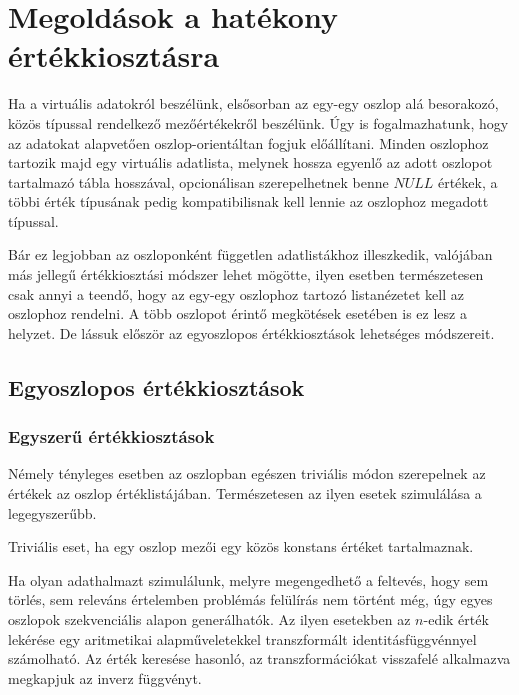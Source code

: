 \documentclass[
    parspace, %
    noindent, %
]{elteiktdk}[2023/10/30]
\begin{document}

\section{Megoldások a hatékony értékkiosztásra}

Ha a virtuális adatokról beszélünk, elsősorban az egy-egy oszlop alá besorakozó,
közös típussal rendelkező mezőértékekről beszélünk.
Úgy is fogalmazhatunk, hogy az adatokat alapvetően oszlop-orientáltan fogjuk előállítani.
Minden oszlophoz tartozik majd egy virtuális adatlista,
melynek hossza egyenlő az adott oszlopot tartalmazó tábla hosszával,
opcionálisan szerepelhetnek benne $NULL$ értékek,
a többi érték típusának pedig kompatibilisnak kell lennie az oszlophoz megadott típussal.

Bár ez legjobban az oszloponként független adatlistákhoz illeszkedik,
valójában más jellegű értékkiosztási módszer lehet mögötte,
ilyen esetben természetesen csak annyi a teendő,
hogy az egy-egy oszlophoz tartozó listanézetet kell az oszlophoz rendelni.
A több oszlopot érintő megkötések esetében is ez lesz a helyzet.
De lássuk először az egyoszlopos értékkiosztások lehetséges módszereit.

\subsection{Egyoszlopos értékkiosztások}


\subsubsection{Egyszerű értékkiosztások}

Némely tényleges esetben az oszlopban egészen triviális módon szerepelnek az értékek az oszlop értéklistájában.
Természetesen az ilyen esetek szimulálása a legegyszerűbb.

Triviális eset, ha egy oszlop mezői egy közös konstans értéket tartalmaznak.

Ha olyan adathalmazt szimulálunk, melyre megengedhető a feltevés,
hogy sem törlés, sem releváns értelemben problémás felülírás nem történt még,
úgy egyes oszlopok szekvenciális alapon generálhatók.
Az ilyen esetekben az $n$-edik érték lekérése
egy aritmetikai alapműveletekkel transzformált identitásfüggvénnyel számolható.
Az érték keresése hasonló, az transzformációkat visszafelé alkalmazva megkapjuk az inverz függvényt.
\end{document}
